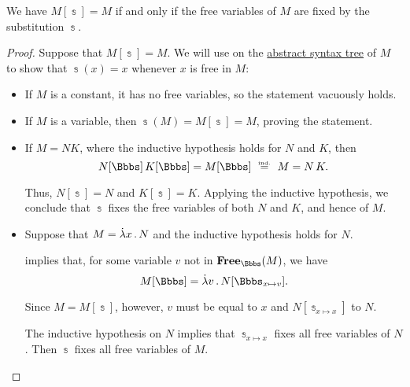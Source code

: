 \begin{proposition}\label{thm:lambda_substitution_noop}
  We have \( M[\Bbbs] = M \) if and only if the free variables of \( M \) are fixed by the substitution \( \Bbbs \).
\end{proposition}
\begin{proof}
  \SufficiencySubProof Suppose that \( M[\Bbbs] = M \). We will use  on the \hyperref[def:lambda_term_ast]{abstract syntax tree} of \( M \) to show that \( \Bbbs(x) = x \) whenever \( x \) is free in \( M \):
  \begin{itemize}
    \item If \( M \) is a constant, it has no free variables, so the statement vacuously holds.
    \item If \( M \) is a variable, then \( \Bbbs(M) = M[\Bbbs] = M \), proving the statement.
    \item If \( M = NK \), where the inductive hypothesis holds for \( N \) and \( K \), then
    \begin{equation*}
      N[\Bbbs] \thinspace K[\Bbbs]
      =
      M[\Bbbs]
      \reloset {\T{ind.}} =
      M
      =
      N \thinspace K.
    \end{equation*}

    Thus, \( N[\Bbbs] = N \) and \( K[\Bbbs] = K \). Applying the inductive hypothesis, we conclude that \( \Bbbs \) fixes the free variables of both \( N \) and \( K \), and hence of \( M \).

    \item Suppose that \( M = \qabs x N \) and the inductive hypothesis holds for \( N \).

     implies that, for some variable \( v \) not in \( \op*{Free}_\Bbbs(M) \), we have
    \begin{equation*}
      M[\Bbbs] = \qabs v N[\Bbbs_{x \mapsto v}].
    \end{equation*}

    Since \( M = M[\Bbbs] \), however, \( v \) must be equal to \( x \) and \( N[\Bbbs_{x \mapsto x}] \) to \( N \).

    The inductive hypothesis on \( N \) implies that \( \Bbbs_{x \mapsto x} \) fixes all free variables of \( N \). Then \( \Bbbs \) fixes all free variables of \( M \).
  \end{itemize}


\end{proof}
